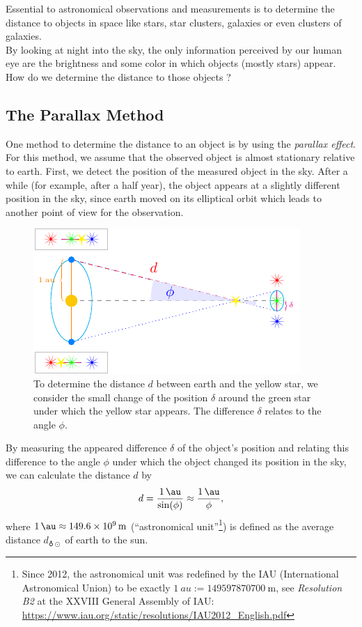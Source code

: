 Essential to astronomical observations and measurements is to determine the distance to objects in space like stars, star clusters, galaxies or even clusters of galaxies. \\
By looking at night into the sky, the only information perceived by our human eye are the brightness and some color in which objects (mostly stars) appear.
How do we determine the distance to those objects ?


\subsection{The Parallax Method}

One method to determine the distance to an object is by using the \textit{parallax effect}. \\
For this method, we assume that the observed object is almost stationary relative to earth.
First, we detect the position of the measured object in the sky. After a while (for example, after a half year), the object appears at a slightly different position in the sky, since earth moved on its elliptical orbit which leads to another point of view for the observation.
\begin{figure}[H]
    \centering
    \includegraphics[scale=1.8]{figures/tikz/parallax/parallax.pdf}
    \caption{To determine the distance $d$ between earth and the yellow star, we consider the small change of the position $\delta$ around the green star under which the yellow star appears. The difference $\delta$ relates to the angle $\phi$.}
\end{figure}
\noindent By measuring the appeared difference $\delta$ of the object's position and relating this difference to the angle $\phi$ under which the object changed its position in the sky, we can calculate the distance $d$ by 
\begin{align}
    d = \frac{\SI{1}{\au}}{\sin(\phi)} \approx \frac{\SI{1}{\au}}{\phi},
\end{align}
where $\SI{1}{\au} \approx \SI{149.6e+9}{\meter}$ (``astronomical unit''\footnote{Since 2012, the astronomical unit was redefined by the IAU (International Astronomical Union) to be exactly $\SI{1}{au} := \SI{149597870700}{\meter}$, see \textit{Resolution B2} at the XXVIII General Assembly of IAU: \href{https://www.iau.org/static/resolutions/IAU2012\_English.pdf}{https://www.iau.org/static/resolutions/IAU2012\_English.pdf}}) is defined as the average distance $d_{\earth \odot}$ of earth to the sun. \\ 
